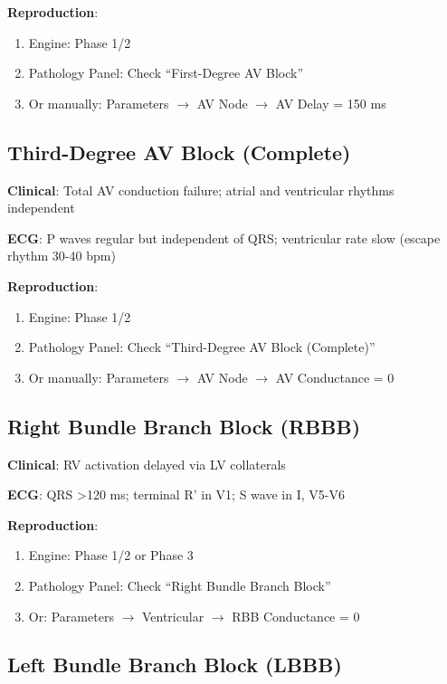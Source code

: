 \documentclass[12pt,a4paper]{article}
\begin{document}
\textbf{Reproduction}:
\begin{enumerate}
    \item Engine: Phase 1/2
    \item Pathology Panel: Check ``First-Degree AV Block''
    \item Or manually: Parameters $\to$ AV Node $\to$ AV Delay = 150 ms
\end{enumerate}

\subsection{Third-Degree AV Block (Complete)}

\textbf{Clinical}: Total AV conduction failure; atrial and ventricular rhythms independent

\textbf{ECG}: P waves regular but independent of QRS; ventricular rate slow (escape rhythm 30-40 bpm)

\textbf{Reproduction}:
\begin{enumerate}
    \item Engine: Phase 1/2
    \item Pathology Panel: Check ``Third-Degree AV Block (Complete)''
    \item Or manually: Parameters $\to$ AV Node $\to$ AV Conductance = 0
\end{enumerate}

\subsection{Right Bundle Branch Block (RBBB)}

\textbf{Clinical}: RV activation delayed via LV collaterals

\textbf{ECG}: QRS >120 ms; terminal R' in V1; S wave in I, V5-V6

\textbf{Reproduction}:
\begin{enumerate}
    \item Engine: Phase 1/2 or Phase 3
    \item Pathology Panel: Check ``Right Bundle Branch Block''
    \item Or: Parameters $\to$ Ventricular $\to$ RBB Conductance = 0
\end{enumerate}

\subsection{Left Bundle Branch Block (LBBB)}
\end{document}
